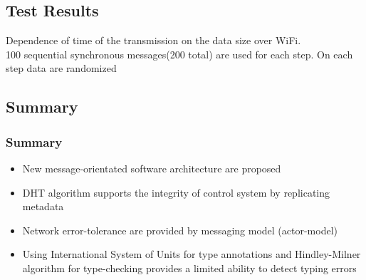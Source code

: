 \documentclass{beamer}
\begin{document}
\subsection{Test Results}
\begin{frame}
Dependence of time of the transmission on the data size over WiFi.
 \\
100 sequential synchronous messages(200 total) are used for each step. On each
step data are randomized

\end{frame}
\subsection{Summary}
\begin{frame}

\frametitle{Summary}
\begin{itemize}
  \item New message-orientated software architecture are proposed
  \item DHT algorithm supports the integrity of control system by replicating
  metadata
  \item Network error-tolerance are provided by messaging model (actor-model)
  \item Using International System of Units for type annotations and
  Hindley-Milner algorithm for type-checking provides a limited ability to
  detect typing errors
\end{itemize}
\end{frame}




\end{document}
